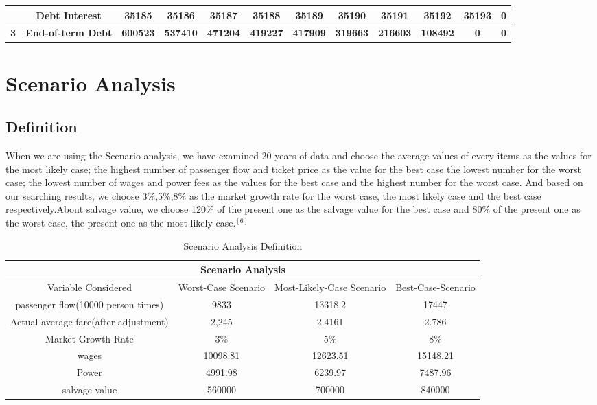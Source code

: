 \documentclass[12pt]{article}
\begin{document}
\begin{table}[htbp]
\begin{tabular}{|c|c|c|c|c|c|c|c|c|c|c|c|}
    \hline
    \rowcolor[rgb]{ .973,  .796,  .678}       & \textbf{Debt Interest} & \textbf{35185} & \textbf{35186} & \textbf{35187} & \textbf{35188} & \textbf{35189} & \textbf{35190} & \textbf{35191} & \textbf{35192} & \textbf{35193} & \textbf{0} \\
    \hline
    \rowcolor[rgb]{ .988,  .894,  .839} \textbf{3} & \textbf{End-of-term Debt} & \textbf{600523} & \textbf{537410} & \textbf{471204} & \textbf{419227} & \textbf{417909} & \textbf{319663} & \textbf{216603} & \textbf{108492} & \textbf{0} & \textbf{0} \\
    \bottomrule
    \end{tabular}%
  \label{tab:addlabel}%
\end{table}%



\section{Scenario Analysis}
\subsection{Definition}
When we are using the Scenario analysis, we have examined 20 years of data and choose the average values of every items as the values for the most likely case; the highest number of passenger flow and ticket price as the value for the best case the lowest number for the worst case; the lowest number of wages and power fees as the values for the best case and the highest number for the worst case. And based on our searching results, we choose 3\%,5\%,8\% as the market growth rate for the worst case, the most likely case and the best case respectively.About salvage value, we choose 120\% of the present one as the salvage value for the best case and 80\% of the present one as the worst case, the present one as the most likely case.$^{[6]}$
\begin{table}[htbp]
\scriptsize
  \centering
  \caption{Scenario Analysis Definition}
    \begin{tabular}{|c|c|c|c|}
    \hline
    \multicolumn{4}{|c|}{\textbf{Scenario Analysis}} \\
    \hline
    Variable Considered & Worst-Case Scenario & Most-Likely-Case Scenario & Best-Case-Scenario \\
    \hline
    passenger flow(10000 person times) & 9833  & 13318.2 & 17447 \\
    \hline
    Actual average fare(after adjustment) & 2,245 & 2.4161 & 2.786 \\
    \hline
    Market Growth Rate & 3\%   & 5\%   & 8\% \\
    \hline
    wages & 10098.81 & 12623.51 & 15148.21 \\
    \hline
    Power & 4991.98 & 6239.97 & 7487.96 \\
    \hline
    salvage value & 560000 & 700000 & 840000 \\
    \hline
    \end{tabular}%
  \label{tab:addlabel}%
\end{table}%
\end{document}
